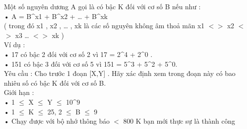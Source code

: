 Một số nguyên dương A gọi là có bậc K đối với cơ số B nếu như :   
\\   • A = B^x1 + B^x2 + … + B^xk   
\\   ( trong đó x1 , x2 , … , xk là các số nguyên không âm thoả mãn x1 $<$$>$ x2 $<$$>$ x3 … $<$$>$ xk )   
\\   Ví dụ :   
\\   • 17 có bậc 2 đối với cơ số 2 vì 17 = 2^4 + 2^0 .   
\\   • 151 có bậc 3 đối với cơ số 5 vì 151 = 5^3 + 5^2 + 5^0.   
\\   Yêu cầu : Cho trước 1 đoạn [X,Y] . Hãy xác định xem trong đoạn này có bao nhiêu số có bậc K đối với cơ số B.   
\\   Giới hạn :   
\\   • 1  $\le$  X  $\le$  Y  $\le$  10^9   
\\   • 1  $\le$  K  $\le$  25, 2  $\le$  B  $\le$  9   
\\   • Chạy được với bộ nhớ thông báo $<$ 800 K bạn mới thực sự là thành công   
\\